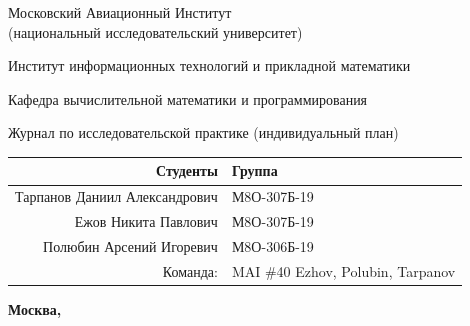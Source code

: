 \documentclass[12pt]{article}
\begin{document}
\begin{titlepage}
\begin{center}
\bfseries

{\Large Московский Авиационный Институт\\ (национальный исследовательский университет)}

\vspace{36pt}

\large Институт информационных технологий и прикладной математики

\vspace{36pt}

\large Кафедра вычислительной математики и программирования

\vspace{48pt}

Журнал по исследовательской практике (индивидуальный план)

\end{center}

\vspace{120pt}

\begin{flushleft}
\begin{tabular}{|r|l|}
\hline
Студенты & Группа \\
\hline
Тарпанов Даниил Александрович & М8О-307Б-19 \\
\hline
Ежов Никита Павлович & М8О-307Б-19 \\
\hline
Полюбин Арсений Игоревич & М8О-306Б-19 \\
\hline
Команда: & MAI \#40 Ezhov, Polubin, Tarpanov \\
\hline
\end{tabular}
\end{flushleft}

\vspace*{\fill}

\begin{center}
\bfseries
Москва, \the\year
\end{center}
\end{titlepage}

\pagebreak
\end{document}
